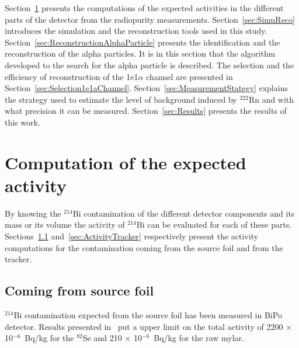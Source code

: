 \documentclass[main.tex]{subfiles}
\begin{document}
\bigskip


\NI Section~\ref{sec:ActivityComputation} presents the computations of the expected activities in the different parts of the detector from the radiopurity measurements.  Section~\ref{sec:SimuReco} introduces the simulation and the reconstruction tools used in this study. Section~\ref{sec:ReconstructionAlphaParticle} presents the identification and the reconstruction of the alpha particles. It is in this section that the algorithm developed to the search for the alpha particle is described. The selection and the efficiency of reconstruction of the 1e1$\alpha$ channel are presented in Section~\ref{sec:Selection1e1aChannel}. Section~\ref{sec:MeasurementStategy} explains the strategy used to estimate the level of background induced by $^{\text{222}}$Rn and with what precision it can be measured. Section~\ref{sec:Results} presents the results of this work.



\FloatBarrier





\section{Computation of the expected activity}\label{sec:ActivityComputation}


\NI By knowing the $^{\text{214}}$Bi contamination of the different detector components and its mass or its volume the activity of $^{\text{214}}$Bi can be evaluated for each of these parts. Sections~\ref{sec:ActivitySourceFoil} and~\ref{sec:ActivityTracker} respectively present the activity computations for the contamination coming from the source foil and from the tracker.  


\subsection{Coming from source foil}\label{sec:ActivitySourceFoil}


\noindent $^{\text{214}}$Bi contamination expected from the source foil has been measured in BiPo detector. Results presented in~\cite{BiPoResultsGomez,BiPoResultsLoaiza} put a upper limit on the total activity of 2200 $\times$ 10$^{-\text{6}}$~Bq/kg for the $^{\text{82}}$Se and 210 $\times$ 10$^{-\text{6}}$~Bq/kg for the raw mylar.  
\end{document}
